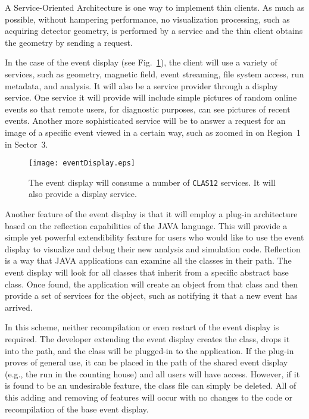 A Service-Oriented Architecture is one way to implement thin clients. As 
much as possible, without hampering performance, no visualization processing, 
such as acquiring detector geometry, is performed by a service and the thin 
client obtains the geometry by sending a request.

In the case of the event display (see Fig.~\ref{fig:eventDisplay}), the 
client will use a variety of services, such as geometry, magnetic field, 
event streaming, file system access, run metadata, and analysis. It will 
also be a service provider through a display service.  One service it will 
provide will include simple pictures of random online events so that remote 
users, for diagnostic purposes, can see pictures of recent events. Another 
more sophisticated service will be to answer a request for an image of a 
specific event viewed in a certain way, such as zoomed in on Region~1 in 
Sector~3.

\begin{figure}[htbp]
\centering
\texttt{[image: eventDisplay.eps]} 
\caption{\small{The event display will consume a number of {\tt CLAS12} 
services. It will also provide a display service.}}
\label{fig:eventDisplay}
\end{figure}

Another feature of the event display is that it will employ a plug-in 
architecture based on the reflection capabilities of the JAVA language. 
This will provide a simple yet powerful extendibility feature for users who 
would like to use the event display to visualize and debug their new analysis 
and simulation code. Reflection is a way that JAVA applications can examine 
all the classes in their path. The event display will look for all classes 
that inherit from a specific abstract base class. Once found, the application 
will create an object from that class and then provide a set of services for 
the object, such as notifying it that a new event has arrived. 

In this scheme, neither recompilation or even restart of the event display is 
required.  The developer extending the event display creates the class, drops 
it into the path, and the class will be plugged-in to the application. If the 
plug-in proves of general use, it can be placed in the path of the shared 
event display (e.g., the run in the counting house) and all users will have 
access.  However, if it is found to be an undesirable feature, the class file 
can simply be deleted.  All of this adding and removing of features will 
occur with no changes to the code or recompilation of the base event display. 

